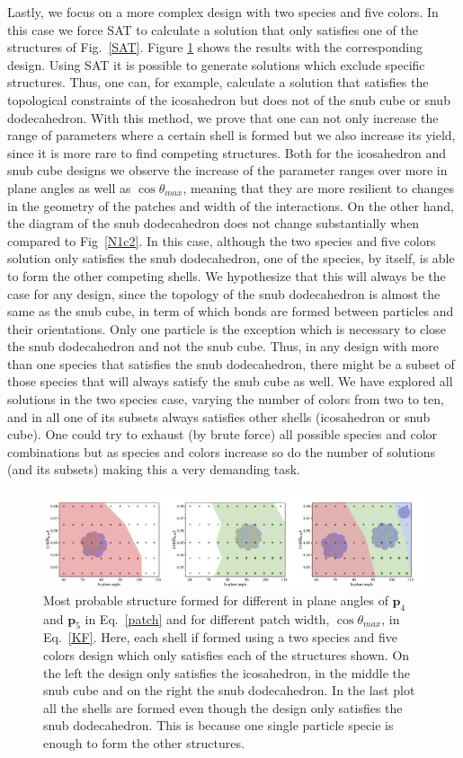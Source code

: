 \documentclass[a4paper, amsfonts, amssymb, amsmath, reprint, showkeys, nofootinbib, twoside]{revtex4-1}
\begin{document}
Lastly, we focus on a more complex design with two species and five colors. In this case we force SAT to calculate a solution that only satisfies one of the structures of Fig.~\ref{SAT}. Figure \ref{Sol} shows the results with the corresponding design. Using SAT it is possible to generate solutions which exclude specific structures. Thus, one can, for example, calculate a solution that satisfies the topological constraints of the icosahedron but does not of the snub cube or snub dodecahedron. With this method, we prove that one can not only increase the range of parameters where a certain shell is formed but we also increase its yield, since it is more rare to find competing structures. Both for the icosahedron and snub cube designs we observe the increase of the parameter ranges over more in plane angles as well as $\cos\theta_{max}$, meaning that they are more resilient to changes in the geometry of the patches and width of the interactions. On the other hand, the diagram of the snub dodecahedron does not change substantially when compared to Fig~\ref{N1c2}. In this case, although the two species and five colors solution only satisfies the snub dodecahedron, one of the species, by itself, is able to form the other competing shells. We hypothesize that this will always be the case for any design, since the topology of the snub dodecahedron is almost the same as the snub cube, in term of which bonds are formed between particles and their orientations. Only one particle is the exception which is necessary to close the snub dodecahedron and not the snub cube. Thus, in any design with more than one species that satisfies the snub dodecahedron, there might be a subset of those species that will always satisfy the snub cube as well. We have explored all solutions in the two species case, varying the number of colors from two to ten, and in all one of its subsets always satisfies other shells (icosahedron or snub cube). One could try to exhaust (by brute force) all possible species and color combinations but as species and colors increase so do the number of solutions (and its subsets) making this a very demanding task.

\begin{figure}[t]
	\includegraphics{fig6.pdf}
	\caption{\label{Sol} Most probable structure formed for different in plane angles of $\textbf{p}_4$ and $\textbf{p}_5$ in Eq.~\ref{patch} and for different patch width, $\cos\theta_{max}$, in Eq.~\ref{KF}. Here, each shell if formed using a two species and five colors design which only satisfies each of the structures shown. On the left the design only satisfies the icosahedron, in the middle the snub cube and on the right the snub dodecahedron. In the last plot all the shells are formed even though the design only satisfies the snub dodecahedron. This is because one single particle specie is enough to form the other structures.}
\end{figure}
\end{document}
